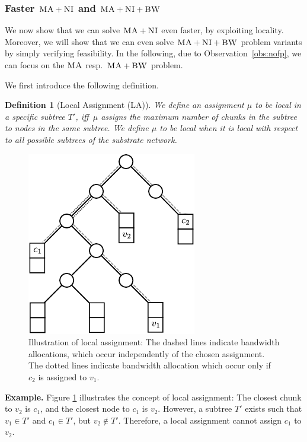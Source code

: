 \documentclass[conference,10pt]{IEEEtran}
\newcommand{\VmChunkAssignment}{\mu}
\newcommand{\CC}{\textsc{NI}}
\newcommand{\BW}{\textsc{BW}}
\newcommand{\MA}{\textsc{MA}}
\newtheorem{defn}{Definition}
\newcommand{\Tree}{\ensuremath{T}}
\begin{document}
\subsubsection{Faster $\MA+\CC$ and $\MA+\CC+\BW$}

We now show that we can solve $\MA+\CC$ even faster, by exploiting
locality. Moreover, we will show that we can
even solve
$\MA+\CC+\BW$ problem variants by simply
verifying feasibility.
In the following, due to Observation~\ref{obs:nofp}, we can focus on
the $\MA$ resp.~$\MA+\BW$ problem.

We first introduce the following definition.
\begin{defn}[Local Assignment (LA)]\label{def:loc}
We define an assignment $\VmChunkAssignment$ to
be \emph{local in a specific subtree $\Tree'$}, iff~$\VmChunkAssignment$
assigns the maximum number of chunks in the
subtree to nodes in the same subtree.
We define $\VmChunkAssignment$ to be \emph{local} when
it is local with respect to all possible subtrees of the substrate network.
\end{defn}

\begin{figure}
\center
\includegraphics[width = 0.6\columnwidth]{figs/unbalanced_tree}
\caption{Illustration of local assignment: The dashed lines indicate bandwidth allocations, which occur
independently of the chosen assignment. The dotted lines indicate bandwidth
allocation which occur only if $c_2$ is assigned to $v_1$.}
\label{fig:unbalanced_tree}
\end{figure}

\textbf{Example.}
Figure \ref{fig:unbalanced_tree} illustrates the concept of local assignment:
The closest chunk to $v_2$ is $c_1$, and the closest node to $c_1$ is $v_2$.
However, a subtree $T'$ exists such that $v_1 \in T'$ and $c_1
\in T'$, but $v_2 \notin T'$. Therefore, a local assignment cannot assign $c_1$ to $v_2$.
\end{document}
